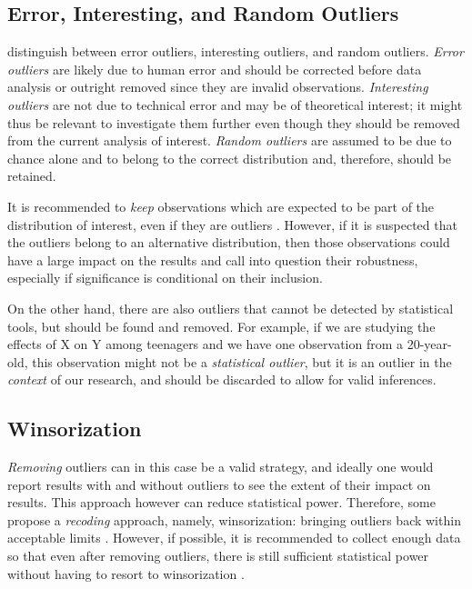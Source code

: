 \documentclass[mathematics,article,submit,moreauthors,pdftex]{mdpi}
\begin{document}
\hypertarget{error-interesting-and-random-outliers}{%
\subsection{Error, Interesting, and Random
Outliers}\label{error-interesting-and-random-outliers}}

\citet{leys2019outliers} distinguish between error outliers, interesting
outliers, and random outliers. \emph{Error outliers} are likely due to
human error and should be corrected before data analysis or outright
removed since they are invalid observations. \emph{Interesting outliers}
are not due to technical error and may be of theoretical interest; it
might thus be relevant to investigate them further even though they
should be removed from the current analysis of interest. \emph{Random
outliers} are assumed to be due to chance alone and to belong to the
correct distribution and, therefore, should be retained.

It is recommended to \emph{keep} observations which are expected to be
part of the distribution of interest, even if they are outliers
\citep{leys2019outliers}. However, if it is suspected that the outliers
belong to an alternative distribution, then those observations could
have a large impact on the results and call into question their
robustness, especially if significance is conditional on their
inclusion.

On the other hand, there are also outliers that cannot be detected by
statistical tools, but should be found and removed. For example, if we
are studying the effects of X on Y among teenagers and we have one
observation from a 20-year-old, this observation might not be a
\emph{statistical outlier}, but it is an outlier in the \emph{context}
of our research, and should be discarded to allow for valid inferences.

\hypertarget{winsorization}{%
\subsection{Winsorization}\label{winsorization}}

\emph{Removing} outliers can in this case be a valid strategy, and
ideally one would report results with and without outliers to see the
extent of their impact on results. This approach however can reduce
statistical power. Therefore, some propose a \emph{recoding} approach,
namely, winsorization: bringing outliers back within acceptable limits
\citep[e.g., 3 MADs][]{tukey1963less}. However, if possible, it is
recommended to collect enough data so that even after removing outliers,
there is still sufficient statistical power without having to resort to
winsorization \citep{leys2019outliers}.
\end{document}
